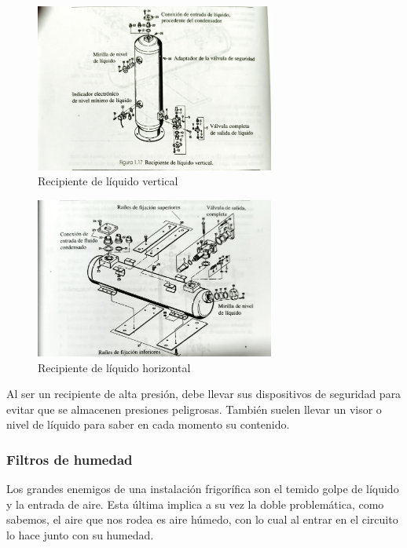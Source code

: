 \begin{figure}[H]
	\centering
	\includegraphics[width=0.7\textwidth]{figuras/recipiente vertical.jpg}
	\caption{Recipiente de líquido vertical}
	\label{fig:Recipiente de líquido vertical}
\end{figure}

\begin{figure}[H]
	\centering
	\includegraphics[width=0.7\textwidth]{figuras/recipiente horizontal.jpg}
	\caption{Recipiente de líquido horizontal}
	\label{fig:Recipiente de líquido horizontal}
\end{figure}

Al ser un recipiente de alta presión, debe llevar sus dispositivos de seguridad para evitar que se almacenen presiones peligrosas. También suelen llevar un visor o nivel de líquido para saber en cada momento su contenido.

\subsubsection{Filtros de humedad}

Los grandes enemigos de una instalación frigorífica son el temido golpe de líquido y la entrada de aire. Esta última implica a su vez la doble problemática, como sabemos, el aire que nos rodea es aire húmedo, con lo cual al entrar en el circuito lo hace junto con su humedad.

